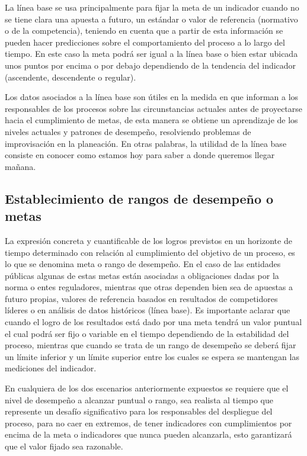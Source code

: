\documentclass[
]{book}
\begin{document}
La línea base se usa principalmente para fijar la meta de un indicador cuando no se tiene clara una apuesta a futuro, un estándar o valor de referencia (normativo o de la competencia), teniendo en cuenta que a partir de esta información se pueden hacer predicciones sobre el comportamiento del proceso a lo largo del tiempo. En este caso la meta podrá ser igual a la línea base o bien estar ubicada unos puntos por encima o por debajo dependiendo de la tendencia del indicador (ascendente, descendente o regular).

Los datos asociados a la línea base son útiles en la medida en que informan a los responsables de los procesos sobre las circunstancias actuales antes de proyectarse hacia el cumplimiento de metas, de esta manera se obtiene un aprendizaje de los niveles actuales y patrones de desempeño, resolviendo problemas de improvisación en la planeación. En otras palabras, la utilidad de la línea base consiste en conocer como estamos hoy para saber a donde queremos llegar mañana.

\hypertarget{establecimiento-de-rangos-de-desempeuxf1o-o-metas}{%
\subsection{Establecimiento de rangos de desempeño o metas}\label{establecimiento-de-rangos-de-desempeuxf1o-o-metas}}

La expresión concreta y cuantificable de los logros previstos en un horizonte de tiempo determinado con relación al cumplimiento del objetivo de un proceso, es lo que se denomina meta o rango de desempeño. En el caso de las entidades públicas algunas de estas metas están asociadas a obligaciones dadas por la norma o entes reguladores, mientras que otras dependen bien sea de apuestas a futuro propias, valores de referencia basados en resultados de competidores líderes o en análisis de datos históricos (línea base). Es importante aclarar que cuando el logro de los resultados está dado por una meta tendrá un valor puntual el cual podrá ser fijo o variable en el tiempo dependiendo de la estabilidad del proceso, mientras que cuando se trata de un rango de desempeño se deberá fijar un límite inferior y un límite superior entre los cuales se espera se mantengan las mediciones del indicador.

En cualquiera de los dos escenarios anteriormente expuestos se requiere que el nivel de desempeño a alcanzar puntual o rango, sea realista al tiempo que represente un desafío significativo para los responsables del despliegue del proceso, para no caer en extremos, de tener indicadores con cumplimientos por encima de la meta o indicadores que nunca pueden alcanzarla, esto garantizará que el valor fijado sea razonable.
\end{document}
